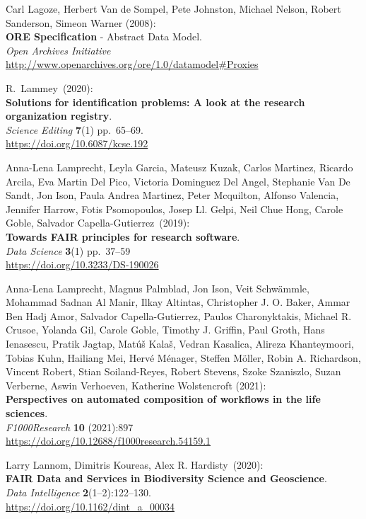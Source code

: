 \begin{thebibliography}{9}
Carl Lagoze, 
Herbert Van de Sompel, 
Pete Johnston, 
Michael Nelson, 
Robert Sanderson, 
Simeon Warner (2008):\\
\textbf{ORE Specification} - {Abstract Data Model}. \\
\emph{Open Archives Initiative}\\
\url{http://www.openarchives.org/ore/1.0/datamodel#Proxies} 

R.~Lammey~(2020):\\
\textbf{Solutions for identification problems: A look at the research
organization registry}.\\
\emph{Science Editing} \textbf{7}(1) pp.~65--69.\\
\url{https://doi.org/10.6087/kcse.192}

Anna-Lena Lamprecht, Leyla Garcia, Mateusz Kuzak, Carlos
Martinez, Ricardo Arcila, Eva Martin Del Pico, Victoria Dominguez Del
Angel, Stephanie Van De Sandt, Jon Ison, Paula Andrea Martinez, Peter
Mcquilton, Alfonso Valencia, Jennifer Harrow, Fotis Psomopoulos, Josep
Ll. Gelpi, Neil Chue Hong, Carole Goble, Salvador Capella-Gutierrez~(2019):\\
\textbf{Towards FAIR principles for research software}.\\
\emph{Data Science} \textbf{3}(1) pp.~37--59\\
\url{https://doi.org/10.3233/DS-190026}

Anna-Lena Lamprecht, Magnus Palmblad, Jon Ison, Veit Schwämmle, Mohammad
Sadnan Al Manir, Ilkay Altintas, Christopher J. O. Baker, Ammar Ben Hadj
Amor, Salvador Capella-Gutierrez, Paulos Charonyktakis, Michael R.
Crusoe, Yolanda Gil, Carole Goble, Timothy J. Griffin, Paul Groth, Hans
Ienasescu, Pratik Jagtap, Matúš Kalaš, Vedran Kasalica, Alireza
Khanteymoori, Tobias Kuhn, Hailiang Mei, Hervé Ménager, Steffen Möller,
Robin A. Richardson, Vincent Robert, Stian Soiland-Reyes, Robert
Stevens, Szoke Szaniszlo, Suzan Verberne, Aswin Verhoeven, Katherine
Wolstencroft (2021): \\
\textbf{Perspectives on automated composition of workflows
in the life sciences}. \\
\emph{F1000Research} \textbf{10} (2021):897 \\
\url{https://doi.org/10.12688/f1000research.54159.1}

Larry Lannom, Dimitris Koureas, Alex R. Hardisty~(2020):\\
\textbf{FAIR Data and Services in Biodiversity Science and
Geoscience}.\\
\emph{Data Intelligence} \textbf{2}(1--2):122--130.\\
\url{https://doi.org/10.1162/dint_a_00034}


\end{thebibliography}
